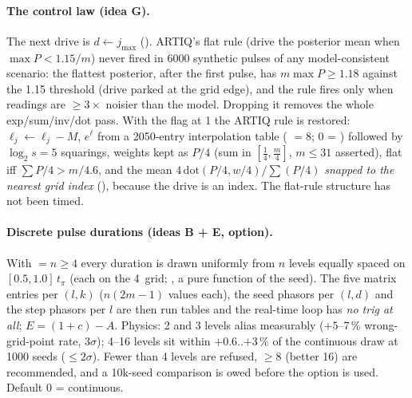 \paragraph{The control law (idea G).} The next drive is $d \leftarrow j_{\max}$
(). ARTIQ's flat rule (drive the posterior
mean when $\max P < 1.15/m$) never fired in 6000 synthetic pulses of any
model-consistent scenario: the flattest posterior, after the first pulse,
has $m \max P \ge 1.18$ against the 1.15 threshold (drive parked at the grid
edge), and the rule fires only when readings are $\ge 3\times$ noisier than
the model. Dropping it removes the whole exp/sum/inv/dot pass. With the flag
at 1 the ARTIQ rule is restored: $\ell_j \leftarrow \ell_j - M$, $e^{\ell}$ from a
2050-entry interpolation table ( $= 8$; 0 =
) followed by $\log_2 s = 5$ squarings, weights kept as $P/4$
(sum in $[\tfrac14, \tfrac m4]$, $m \le 31$ asserted), flat iff $\sum P/4 >
m/4.6$, and the mean $4\,\mathrm{dot}(P/4, w/4)/\sum(P/4)$ \emph{snapped to the
nearest grid index} (), because the drive is an index. The
flat-rule structure has not been timed.

\paragraph{Discrete pulse durations (ideas B + E, option).} With
 $= n \ge 4$ every duration is drawn
uniformly from $n$ levels equally spaced on $[0.5, 1.0]\,t_\pi$ (each on the
4\nsu\ grid; , a pure function of the
seed). The five matrix entries per $(l, k)$ ($n(2m-1)$ values each), the seed
phasors per $(l, d)$ and the step phasors per $l$ are then run tables and the
real-time loop has \emph{no trig at all}; $E = (1 + c) - A$. Physics: 2 and 3
levels alias measurably ($+5$--7\,\% wrong-grid-point rate, $3\sigma$); 4--16
levels sit within $+0.6$..$+3$\,\% of the continuous draw at 1000 seeds
($\le 2\sigma$). Fewer than 4 levels are refused, $\ge 8$ (better 16) are
recommended, and a 10k-seed comparison is owed before the option is used.
Default 0 = continuous.


